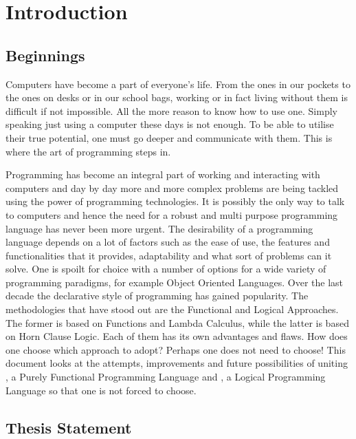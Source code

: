 \documentclass[thesis-solanki.tex]{subfiles}
\begin{document}
\chapter{Introduction}\label{chap:introduction}
\section{Beginnings}
Computers have become a part of everyone's life. From the ones in our pockets to the ones on desks or in our school bags, working or in fact living without 
them is difficult if not impossible. All the more reason to know how to use one. Simply speaking just using a computer these days is not enough. To be able 
to utilise their true potential, one must go deeper and communicate with them. This is where the art of programming steps in.     

\par Programming has become an integral part of working and interacting with computers and day by day more and more complex problems are being 
tackled using the power of programming technologies. It is possibly the only way to talk to computers and hence the need for a robust and multi purpose 
programming language has never been more urgent. The desirability of a programming language depends on a lot of factors such as the ease of use, the 
features and functionalities that it provides, adaptability and what sort of problems can it solve. One is  spoilt for choice with a number of options for a 
wide variety of programming paradigms, for example Object Oriented Languages. Over the last decade the declarative style of programming has gained 
popularity. The methodologies that have stood out are the Functional and Logical Approaches. The former is based on Functions and Lambda Calculus, 
while the latter is based on Horn Clause Logic. Each of them has its own advantages and ﬂaws. How does one choose which approach to adopt? Perhaps
one does not need to choose! This document looks at the attempts, improvements and future possibilities of uniting , a Purely 
Functional Programming Language and , a Logical Programming Language so that one is not forced to choose.

\section{Thesis Statement}
\end{document}
